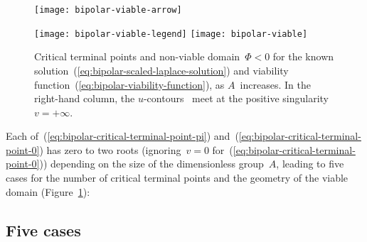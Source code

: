 \begin{figure}
  \centering
  \begin{minipage}[b]{0.1\textwidth}
    \texttt{[image: bipolar-viable-arrow]}
  \end{minipage}
  \begin{minipage}[b]{0.8\textwidth}
    \newcommand*{\legendtrimwidth}{0.03\textwidth}
    \newcommand*{\legendoffsetheight}{0.025\textwidth}
    \texttt{[image: bipolar-viable-legend]}
    \texttt{[image: bipolar-viable]}
  \end{minipage}
  \caption{
    Critical terminal points and non-viable domain~$\Phi < 0$
    for the known solution~(\ref{eq:bipolar-scaled-laplace-solution})
    and viability function~(\ref{eq:bipolar-viability-function}),
    as $A$~increases.
    In the right-hand column,
    the $u$-contours~ meet
    at the positive singularity~$v = +\infty$.
  }
  \label{fig:bipolar-viable}
\end{figure}

Each of~(\ref{eq:bipolar-critical-terminal-point-pi})
and~(\ref{eq:bipolar-critical-terminal-point-0})
has zero to two roots
(ignoring~$v = 0$ for~(\ref{eq:bipolar-critical-terminal-point-0}))
depending on the size of the dimensionless group~$A$,
leading to five cases for the number of critical terminal points
and the geometry of the viable domain
(Figure~\ref{fig:bipolar-viable}):

\subsection{Five cases}
\label{sec:bipolar.viable.cases}

